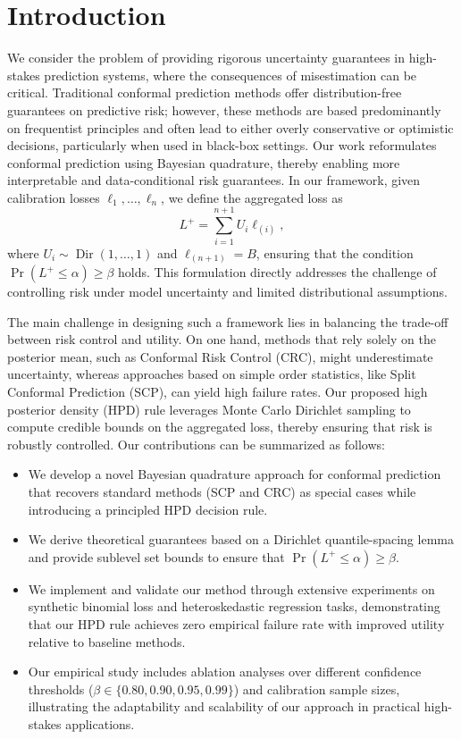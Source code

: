 \documentclass{article} %
\begin{document}
\section{Introduction}
We consider the problem of providing rigorous uncertainty guarantees in high-stakes prediction systems, where the consequences of misestimation can be critical. Traditional conformal prediction methods offer distribution-free guarantees on predictive risk; however, these methods are based predominantly on frequentist principles and often lead to either overly conservative or optimistic decisions, particularly when used in black-box settings. Our work reformulates conformal prediction using Bayesian quadrature, thereby enabling more interpretable and data-conditional risk guarantees. In our framework, given calibration losses $\ell_1, \dots, \ell_n$, we define the aggregated loss as 
\[
L^+ = \sum_{i=1}^{n+1} U_i \ell_{(i)},
\]
where $U_i \sim \operatorname{Dir}(1,\dots,1)$ and $\ell_{(n+1)} = B$, ensuring that the condition $\Pr(L^+ \leq \alpha) \geq \beta$ holds. This formulation directly addresses the challenge of controlling risk under model uncertainty and limited distributional assumptions.

The main challenge in designing such a framework lies in balancing the trade-off between risk control and utility. On one hand, methods that rely solely on the posterior mean, such as Conformal Risk Control (CRC), might underestimate uncertainty, whereas approaches based on simple order statistics, like Split Conformal Prediction (SCP), can yield high failure rates. Our proposed high posterior density (HPD) rule leverages Monte Carlo Dirichlet sampling to compute credible bounds on the aggregated loss, thereby ensuring that risk is robustly controlled. Our contributions can be summarized as follows:
\begin{itemize}
    \item We develop a novel Bayesian quadrature approach for conformal prediction that recovers standard methods (SCP and CRC) as special cases while introducing a principled HPD decision rule.
    \item We derive theoretical guarantees based on a Dirichlet quantile-spacing lemma and provide sublevel set bounds to ensure that $\Pr(L^+ \leq \alpha) \geq \beta$.
    \item We implement and validate our method through extensive experiments on synthetic binomial loss and heteroskedastic regression tasks, demonstrating that our HPD rule achieves zero empirical failure rate with improved utility relative to baseline methods.
    \item Our empirical study includes ablation analyses over different confidence thresholds ($\beta \in \{0.80, 0.90, 0.95, 0.99\}$) and calibration sample sizes, illustrating the adaptability and scalability of our approach in practical high-stakes applications.
\end{itemize}
\end{document}
